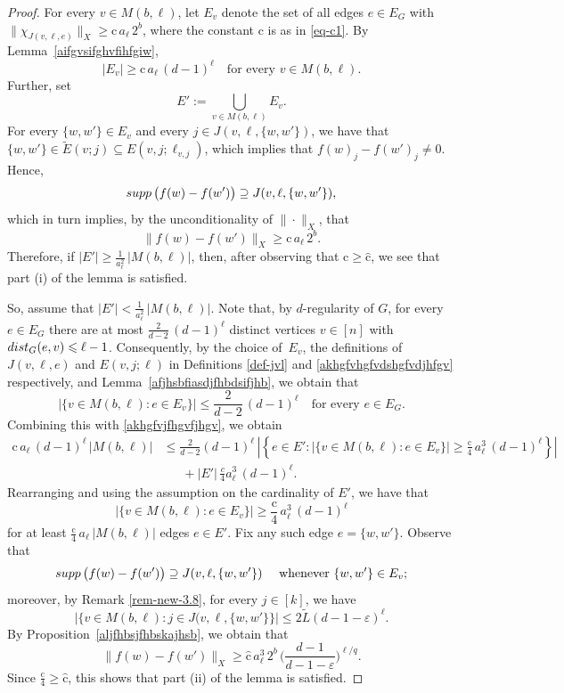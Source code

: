 \documentclass[11pt,leqno]{amsart}
\theoremstyle{remark}
\theoremstyle{plain}
\newcommand{\supp}{{\rm supp\,}}
\def\dist{{\rm dist}}
\def\dist{{\rm dist}}
\begin{document}
\begin{proof}
For every $v\in M(b,\ell)$, let $E_v$ denote the set of all edges $e\in E_G$ with
$\|\chi_{J(v,\ell,e)}\|_X\geqslant \mathrm{c}\,a_\ell\,2^b$, where the constant $\mathrm{c}$ is as in \eqref{eq-c1}.
By Lemma~\ref{aifgvsifghvfihfgiw},
\begin{equation} \label{akhgfvjfhgvfjhgv}
|E_v|\geqslant \mathrm{c}\,a_\ell\,(d-1)^\ell \ \ \ \text{ for every } v\in M(b,\ell).
\end{equation}
Further, set
$$ E':=\bigcup\limits_{v\in M(b,\ell)}E_v. $$
For every $\{w,w'\}\in E_v$ and every $j\in J(v,\ell,\{w,w'\})$, we have that
$\{w,w'\}\in \tilde E(v;j)\subseteq E(v,j;\ell_{v,j})$, which implies that $f(w)_j-f(w')_j\neq 0$. Hence,
$$ \supp\big(f(w)-f(w')\big)\supseteq J(v,\ell,\{w,w'\}), $$
which in turn implies, by the unconditionality of $\|\cdot\|_X$, that
$$ \|f(w)-f(w')\|_X\geqslant \mathrm{c}\,a_\ell\,2^b. $$
Therefore, if $|E'|\geqslant \frac{1}{a_\ell^2}\,|M(b,\ell)|$, then, after observing that $\mathrm{c}\geqslant \hat{\mathrm{c}}$,
we see that part (i) of the lemma is satisfied.

So, assume that $|E'|<\frac{1}{a_\ell^2}\,|M(b,\ell)|$. Note that, by $d$-regularity of $G$,
for every $e\in E_G$ there are at most $\frac{2}{d-2}\,(d-1)^\ell$ distinct vertices $v\in[n]$ with
$\dist_G(e,v)\leqslant \ell-1$. Consequently, by the choice of~$E_v$, the definitions of $J(v,\ell,e)$ and
$E(v,j;\ell)$ in Definitions \ref{def-jvl} and \ref{akhgfvhgfvdshgfvdjhfgv} respectively,
and Lemma~\ref{afjhsbfiasdjfhbdsifjhb}, we obtain that
$$ \big|\{v\in M(b,\ell)\colon e\in E_v\}\big|\leqslant \frac{2}{d-2}\,(d-1)^\ell \ \ \ \text{ for every } e\in E_G. $$
Combining this with \eqref{akhgfvjfhgvfjhgv}, we obtain
\begin{align*}
\mathrm{c}\,a_\ell\,(d-1)^\ell\,|M(b,\ell)| &\leqslant  \frac{2}{d-2}(d-1)^\ell \,\left|\left\{e \in E'\colon
\big|\{v\in M(b,\ell)\colon e\in E_v\}\big|\geqslant \frac{\mathrm{c}}{4}\,a_\ell^3\,(d-1)^\ell\right\}\right|  \\
& \ \ \ \ \ \ \  + |E'|\, \frac{c}{4}a_\ell^3\,(d-1)^\ell.
\end{align*}
Rearranging and using the assumption on the cardinality of $E'$, we have that
$$ \big|\{v\in M(b,\ell)\colon e\in E_v\}\big|\geqslant \frac{\mathrm{c}}{4}\,a_\ell^3\,(d-1)^\ell $$
for at least $\frac{\mathrm{c}}{4}\,a_\ell\,|M(b,\ell)|$ edges $e\in E'$.
Fix any such edge $e=\{w,w'\}$. Observe that
$$ \supp\big(f(w)-f(w')\big)\supseteq J(v,\ell,\{w,w'\}) \ \ \ \text{ whenever } \{w,w'\}\in E_v; $$
moreover, by Remark \ref{rem-new-3.8}, for every $j\in [k]$, we have
$$ \big|\big\{ v\in M(b,\ell)\colon j\in J(v,\ell,\{w,w'\}\big\}\big| \leqslant 2\tilde L(d-1-\varepsilon)^\ell. $$
By Proposition~\ref{aljfhbsjfhbskajhsb}, we obtain that
$$ \|f(w)-f(w')\|_X \geqslant \hat{\mathrm{c}}\,a_\ell^3\,2^b\,\bigg(\frac{d-1}{d-1-\varepsilon} \bigg)^{\ell/q}. $$
Since $\frac{\mathrm{c}}{4}\geqslant \hat{\mathrm{c}}$, this shows that part (ii) of the lemma is satisfied.
\end{proof}
\end{document}
